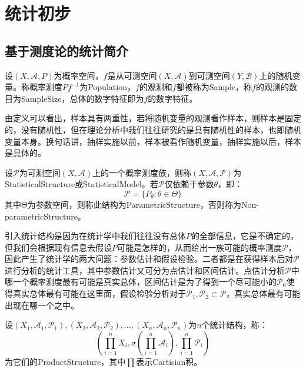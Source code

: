 \chapter{统计初步}

\section{基于测度论的统计简介}
\begin{definition}
	设$(X,\mathscr{A},P)$为概率空间，$f$是从可测空间$(X,\mathscr{A})$到可测空间$(Y,\mathscr{B})$上的随机变量。称概率测度$Pf^{-1}$为\gls{Population}，$f$的观测和$f$都被称为\gls{Sample}，称$f$的观测的数目为\gls{SampleSize}，总体的数字特征即为$f$的数字特征。
\end{definition}
\begin{note}
	由定义可以看出，样本具有两重性，若将随机变量的观测看作样本，则样本是固定的，没有随机性，但在理论分析中我们往往研究的是具有随机性的样本，也即随机变量本身。换句话讲，抽样实施以前，样本被看作随机变量，抽样实施以后，样本是具体的。
\end{note}
\begin{definition}
	设$\mathscr{P}$为可测空间$(X,\mathscr{A})$上的一个概率测度族，则称$(X,\mathscr{A},\mathscr{P})$为\gls{StatisticalStructure}或\gls{StatisticalModel}。若$\mathscr{P}$仅依赖于参数$\theta$，即：
	\begin{equation*}
		\mathscr{P}=\{P_{\theta}:\theta\in\Theta\}
	\end{equation*}
	其中$\Theta$为参数空间，则称此结构为\gls{ParametricStructure}，否则称为\gls{Non-parametricStructure}。
\end{definition}
\begin{note}
	引入统计结构是因为在统计学中我们往往没有总体$P$的全部信息，它是不确定的，但我们会根据现有信息去假设$P$可能是怎样的，从而给出一族可能的概率测度$\mathscr{P}$，因此产生了统计学的两大问题：参数估计和假设检验。二者都是在获得样本后对$\mathscr{P}$进行分析的统计工具，其中参数估计又可分为点估计和区间估计。点估计分析$\mathscr{P}$中哪一个概率测度最有可能是真实总体，区间估计是为了得到一个尽可能小的$\mathscr{P}_0$使得真实总体最有可能在这里面，假设检验分析对于$\mathscr{P}_1,\mathscr{P}_2\subset\mathscr{P}$，真实总体最有可能出现在哪一个之中。
\end{note}
\begin{definition}
	设$(X_1,\mathscr{A}_1,\mathscr{P}_1),(X_2,\mathscr{A}_2,\mathscr{P}_2),\dots,(X_n,\mathscr{A}_n,\mathscr{P}_n)$为$n$个统计结构，称：
	\begin{equation*}
		\left(\prod_{i=1}^nX_i,\sigma\left(\prod_{i=1}^n\mathscr{A}_i\right),\prod_{i=1}^n\mathscr{P}_i\right)
	\end{equation*}
	为它们的\gls{ProductStructure}，其中$\prod$表示Cartisian积。
\end{definition}
